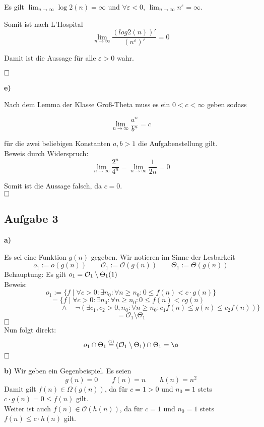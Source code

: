 \documentclass[a4paper,graphics,11pt]{article}
\newcommand{\aufgabe}[1]{\subsection*{Aufgabe #1}}
\newcommand{\up}[2]{\mathrel{\overset{\makebox[0pt]{\mbox{\normalfont\tiny #2}}}{#1}}}
\begin{document}
Es gilt $\lim_{n\rightarrow\infty} \log2 (n) = \infty$ und $\forall\varepsilon < 0 $,
$\lim_{n\rightarrow\infty}  n^\varepsilon = \infty$.

Somit ist nach L'Hospital 
$$
\lim_{n\rightarrow\infty} \frac{(log2(n))'}{(n^\varepsilon)'} = 0
$$

Damit ist die Aussage für alle $\varepsilon>0$ wahr.

$\hfill\square$

\textbf{e)}


Nach dem Lemma der Klasse Groß-Theta muss es ein $ 0 < c< \infty$ geben sodass

$$
\lim_{n\rightarrow\infty} \frac{a^n}{b^n} = c
$$

für die zwei beliebigen Konstanten $a,b > 1$ die Aufgabenstellung gilt.\\
Beweis durch Widerspruch:\\
$$
\lim_{n\rightarrow\infty} \frac{2^n}{4^n} = \lim_{n\rightarrow\infty} \frac{1}{2n} = 0
$$

Somit ist die Aussage falsch, da $c=0$.\\

$\hfill\square$

\newpage

\aufgabe{3}
\textbf{a)}

Es sei eine Funktion $g(n)$ gegeben.
Wir notieren im Sinne der Lesbarkeit
$$
	o_1 := o(g(n)) \qquad \mathcal{O}_1 := \mathcal{O}(g(n)) \qquad \Theta_1 := \Theta(g(n))
$$
Behauptung: Es gilt $o_1 = \mathcal{O}_1 \setminus \Theta_1\hfill(1)$\\
Beweis:
$$
	o_1 := \{f \mid \forall c > 0 : \exists n_0 : \forall n\geq n_0 : 0 \leq f(n) < c\cdot g(n)\}
$$$$
	= \{f \mid \forall c > 0 : \exists n_0 : \forall n\geq n_0 : 0 \leq f(n) < cg(n)\quad
$$$$
	\qquad\qquad\qquad\qquad\land \quad \lnot(\exists c_1,c_2 > 0,n_0 : \forall n\geq n_0 : c_1f(n) \leq g(n) \leq c_2f(n))\}
$$$$
	= \mathcal{O}_1 \setminus \Theta_1
$$
$\hfill\square$\\
Nun folgt direkt:
$$
	o_1 \cap \Theta_1
	\up{=}{(1)} (\mathcal{O}_1 \setminus \Theta_1) \cap \Theta_1 = \o
$$
$\hfill\square$

\textbf{b)}
Wir geben ein Gegenbeispiel.
Es seien
$$
	g(n) = 0 \qquad f(n) = n \qquad h(n) = n^2
$$
Damit gilt $f(n) \in \Omega(g(n))$, da für $c = 1 > 0$ und $n_0 = 1$ stets $c\cdot g(n) = 0 \leq f(n)$ gilt.\\
Weiter ist auch $f(n) \in \mathcal{O}(h(n))$, da für $c = 1$ und $n_0 = 1$ stets $f(n) \leq c\cdot h(n)$ gilt.
\end{document}
